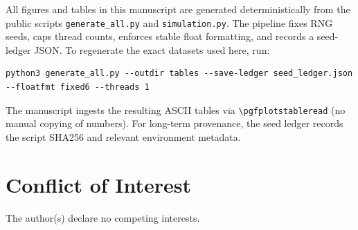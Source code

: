 \documentclass[11pt,a4paper]{article}
\theoremstyle{plain}
\theoremstyle{definition}
\theoremstyle{remark}
\begin{document}
All figures and tables in this manuscript are generated deterministically from the public scripts \texttt{generate\_all.py} and \texttt{simulation.py}. The pipeline fixes RNG seeds, caps thread counts, enforces stable float formatting, and records a seed-ledger JSON. To regenerate the exact datasets used here, run:
\begin{lstlisting}[basicstyle=\ttfamily\small,breaklines=true,columns=fullflexible]
python3 generate_all.py --outdir tables --save-ledger seed_ledger.json --floatfmt fixed6 --threads 1
\end{lstlisting}
The manuscript ingests the resulting ASCII tables via \verb|\pgfplotstableread| (no manual
copying of numbers). For long-term provenance, the seed ledger records the script SHA256 and
relevant environment metadata.

\section*{Conflict of Interest}
The author(s) declare no competing interests.



\end{document}
